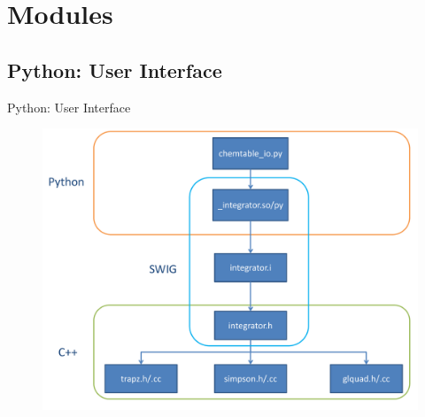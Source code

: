 \documentclass{beamer}
\begin{document}
\section{Modules}
\subsection{Python: User Interface}
\begin{frame}{Python: User Interface}

\begin{figure}
\includegraphics[width=\textwidth]{python_swig_c++.pdf}
\end{figure}


\end{frame}

\end{document}
